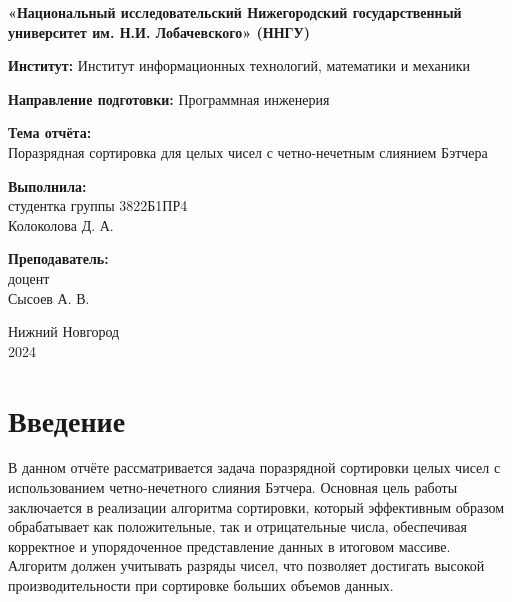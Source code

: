 \documentclass[12pt]{article}
\begin{document}
\begin{titlepage}
    \begin{center}
        \vspace*{1cm}

        \Large
        \textbf{«Национальный исследовательский  
        Нижегородский государственный университет им. Н.И. Лобачевского» (ННГУ)} 

        \vspace{1.5cm}

        \large
        \textbf {Институт:} {Институт информационных технологий, математики и механики}

        \vspace{0.5cm}

        \textbf {Направление подготовки:} {Программная инженерия}

        \vspace{1.5cm}

        \textbf{Тема отчёта:} \\ 
        {Поразрядная сортировка для целых чисел с четно-нечетным слиянием Бэтчера}

        \vspace{1.5cm}

        \textbf{Выполнила:} \\ 
        студентка группы 3822Б1ПР4 \\ 
        Колоколова Д. А. 

        \vspace{0.5cm}

        \textbf{Преподаватель:} \\ 
        доцент \\ 
        Сысоев А. В.

        \vfill

        \Large
        Нижний Новгород \\

        2024

    \end{center}
\end{titlepage}

\section{Введение}

 В данном отчёте рассматривается задача поразрядной сортировки целых чисел с использованием четно-нечетного слияния Бэтчера. Основная цель работы заключается в реализации алгоритма сортировки, который эффективным образом обрабатывает как положительные, так и отрицательные числа, обеспечивая корректное и упорядоченное представление данных в итоговом массиве. Алгоритм должен учитывать разряды чисел, что позволяет достигать высокой производительности при сортировке больших объемов данных.
\end{document}
